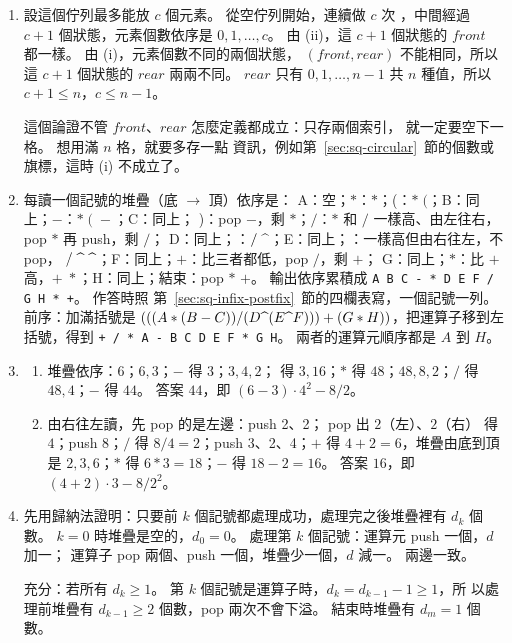 \begin{enumerate}
\item 設這個佇列最多能放 $c$ 個元素。 從空佇列開始，連續做 $c$ 次
，中間經過 $c + 1$ 個狀態，元素個數依序是 $0, 1, \ldots, c$。 由
(ii)，這 $c + 1$ 個狀態的 $\mathit{front}$ 都一樣。 由 (i)，元素個數不同的兩個狀態，
$(\mathit{front}, \mathit{rear})$ 不能相同，所以這 $c + 1$ 個狀態的 $\mathit{rear}$
兩兩不同。 $\mathit{rear}$ 只有 $0, 1, \ldots, n - 1$ 共 $n$ 種值，所以
$c + 1 \le n$，$c \le n - 1$。

這個論證不管 $\mathit{front}$、$\mathit{rear}$ 怎麼定義都成立：只存兩個索引，
就一定要空下一格。 想用滿 $n$ 格，就要多存一點
資訊，例如第~\ref{sec:sq-circular}~節的個數或旗標，這時 (i) 不成立了。

\item 每讀一個記號的堆疊（底 $\to$ 頂）依序是：
A：空；$*$：$*$；(：$*\;($；B：同上；$-$：$*\;(\;-$；C：同上；
)：pop $-$，剩 $*$；$/$：$*$ 和 $/$ 一樣高、由左往右，pop $*$ 再 push，剩 $/$；
D：同上；\sqpow：$/\;\text{\textasciicircum}$；E：同上；\sqpow：一樣高但由右往左，不 pop，
$/\;\text{\textasciicircum}\;\text{\textasciicircum}$；F：同上；$+$：比三者都低，pop \sqpow{} \sqpow{} $/$，剩 $+$；
G：同上；$*$：比 $+$ 高，$+\;*$；H：同上；結束：pop $*$ $+$。 輸出依序累積成
\texttt{A B C - * D E F \sqpow{} \sqpow{} / G H * +}。 作答時照
第~\ref{sec:sq-infix-postfix}~節的四欄表寫，一個記號一列。 前序：加滿括號是
$(((A * (B - C)) / (D \text{\textasciicircum} (E \text{\textasciicircum} F))) + (G * H))$，把運算子移到左括號，得到
\texttt{+ / * A - B C \sqpow{} D \sqpow{} E F * G H}。 兩者的運算元順序都是 $A$ 到
$H$。


\item
\begin{enumerate}
\item 堆疊依序：$6$；$6, 3$；$-$ 得 $3$；$3, 4, 2$；\sqpow{} 得 $3, 16$；$*$ 得
$48$；$48, 8, 2$；$/$ 得 $48, 4$；$-$ 得 $44$。 答案 $44$，即
$(6 - 3) \cdot 4^2 - 8 / 2$。
\item 由右往左讀，先 pop 的是左邊：push 2、2；\sqpow{} pop 出 $2$（左）、$2$（右）
得 $4$；push 8；$/$ 得 $8 / 4 = 2$；push 3、2、4；$+$ 得 $4 + 2 = 6$，堆疊由底到頂
是 $2, 3, 6$；$*$ 得 $6 * 3 = 18$；$-$ 得 $18 - 2 = 16$。 答案 $16$，即
$(4 + 2) \cdot 3 - 8 / 2^2$。
\end{enumerate}

\item 先用歸納法證明：只要前 $k$ 個記號都處理成功，處理完之後堆疊裡有 $d_k$ 個數。
$k = 0$ 時堆疊是空的，$d_0 = 0$。 處理第 $k$ 個記號：運算元 push 一個，$d$ 加一；
運算子 pop 兩個、push 一個，堆疊少一個，$d$ 減一。 兩邊一致。

充分：若所有 $d_k \ge 1$。 第 $k$ 個記號是運算子時，$d_k = d_{k-1} - 1 \ge 1$，所
以處理前堆疊有 $d_{k-1} \ge 2$ 個數，pop 兩次不會下溢。 結束時堆疊有 $d_m = 1$ 個
數。


\end{enumerate}
